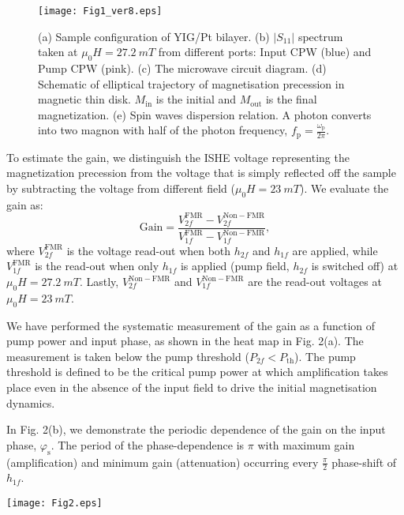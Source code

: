 \documentclass[%
 reprint,
 amsmath,amssymb,
 aps,
prb,
]{revtex4-2}
\begin{document}
\begin{figure}
\texttt{[image: Fig1\_ver8.eps]}
\caption{\label{fig:epsart} (a) Sample configuration of YIG/Pt bilayer. (b) $|S_{11}|$ spectrum  taken at  $\mu_0H=27.2\ \si{mT}$ from different ports: Input CPW (blue) and Pump CPW (pink). (c) The microwave circuit diagram. (d) Schematic of elliptical trajectory of magnetisation precession in magnetic thin disk. $M_{\mathrm{in}}$ is the initial and $M_{\mathrm{out}}$ is the final magnetization. (e) Spin waves dispersion relation. A photon converts into two magnon with half of the photon frequency, $f_\mathrm{p}= \frac{\omega_{\mathrm{p}}}{2\pi}$.}
\end{figure}

To estimate the gain, we  distinguish the ISHE voltage representing the magnetization precession from the voltage that is simply reflected off the sample by subtracting the voltage from different field ($\mu_0 H=23\ \si{mT}$). We evaluate the gain as:
\begin{equation}
    \mathrm{Gain}= \frac{V_{2f}^{\mathrm{FMR}}-V_{2f}^{\mathrm{Non-FMR}}}{V_{1f}^{\mathrm{FMR}}-V_{1f}^{\mathrm{Non-FMR}}} ,			
\end{equation}
 where $V_{2f}^{\mathrm{FMR}}$ is the voltage read-out when both  $h_{2f}$ and $h_{1f}$ are applied, while $V_{1f}^{\mathrm{FMR}}$ is the read-out when only $h_{1f}$ is applied (pump field, $h_{2f}$ is switched off) at $\mu_0 H=27.2\ \si{mT}$. Lastly, $V_{2f}^{\mathrm{Non-FMR}}$ and $V_{1f}^{\mathrm{Non-FMR}}$ are the read-out voltages at $\mu_0 H=23\ \si{mT}$. 

We have performed the systematic measurement of the gain as a function of pump power and input phase, as shown in the heat map in Fig. 2(a). The measurement is taken below the pump threshold ($P_{2f}<P_{\mathrm{th}}$). The pump threshold is defined to be the critical pump power at which amplification takes place even in the absence of the input field to drive the initial magnetisation dynamics. 

In Fig. 2(b), we demonstrate the periodic dependence of the gain on the input phase, $\varphi_\mathrm{s}$. The period of the phase-dependence is $\pi$ with maximum gain (amplification) and minimum gain (attenuation) occurring every $\frac{\pi}{2}$ phase-shift of $h_{1f}$. 

\begin{figure*}[ht]
    \texttt{[image: Fig2.eps]}
    \caption{\label{fig:epsart} (a) Heat map of the gain (dB) with respect to pump power and input phase. (b) Gain dependence on input phases at three different pump power. (c) The dependence of maximum gain (amplification) and minimum gain (attenuation) on pump power. The black dashed-curves represent the 0.68 confidence bound of the fit curves. The grey dotted-line shows the gain when the pump field is switched off.}
\end{figure*}
\end{document}
